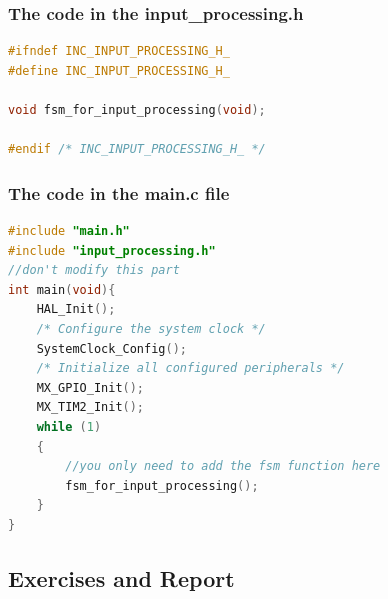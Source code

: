 \subsubsection{The code in the input\_processing.h}
\begin{lstlisting}[caption=Code in the input\_processing.h file,language=C]
#ifndef INC_INPUT_PROCESSING_H_
#define INC_INPUT_PROCESSING_H_

void fsm_for_input_processing(void);

#endif /* INC_INPUT_PROCESSING_H_ */
\end{lstlisting}


\subsubsection{The code in the main.c file}
\begin{lstlisting}[caption=The code in the main.c file,language=C]
#include "main.h"
#include "input_processing.h"
//don't modify this part
int main(void){
    HAL_Init();
    /* Configure the system clock */
    SystemClock_Config();
    /* Initialize all configured peripherals */
    MX_GPIO_Init();
    MX_TIM2_Init();
    while (1)
    {
        //you only need to add the fsm function here
        fsm_for_input_processing();
    }
}
\end{lstlisting}

\newpage
\subsection{Exercises and Report}
